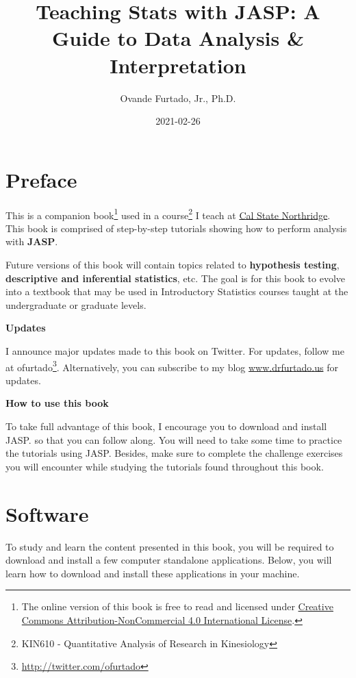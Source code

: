 \documentclass[
]{book}
\title{Teaching Stats with JASP: A Guide to Data Analysis \& Interpretation}
\author{Ovande Furtado, Jr., Ph.D.}
\date{2021-02-26}
\begin{document}
\maketitle

{
\setcounter{tocdepth}{1}
\tableofcontents
}
\hypertarget{preface}{%
\chapter*{Preface}\label{preface}}

This is a companion book\footnote{The online version of this book is free to read and licensed under \href{http://creativecommons.org/licenses/by-nc/4.0/}{Creative Commons Attribution-NonCommercial 4.0 International License}.} used in a course\footnote{KIN610 - Quantitative Analysis of Research in Kinesiology} I teach at \href{https://academics.csun.edu/faculty/ovande.furtado}{Cal State Northridge}. This book is comprised of step-by-step tutorials showing how to perform analysis with \textbf{JASP}.

Future versions of this book will contain topics related to \textbf{hypothesis testing}, \textbf{descriptive and inferential statistics}, etc. The goal is for this book to evolve into a textbook that may be used in Introductory Statistics courses taught at the undergraduate or graduate levels.

\textbf{Updates}

I announce major updates made to this book on Twitter. For updates, follow me at ofurtado\footnote{\url{http://twitter.com/ofurtado}}. Alternatively, you can subscribe to my blog \href{http://drfurtado.us}{www.drfurtado.us} for updates.

\textbf{How to use this book}

To take full advantage of this book, I encourage you to download and install JASP. so that you can follow along. You will need to take some time to practice the tutorials using JASP. Besides, make sure to complete the challenge exercises you will encounter while studying the tutorials found throughout this book.

\hypertarget{appendix-appendices}{%
\appendix}


\hypertarget{software}{%
\chapter{Software}\label{software}}

To study and learn the content presented in this book, you will be required to download and install a few computer standalone applications. Below, you will learn how to download and install these applications in your machine.
\end{document}

